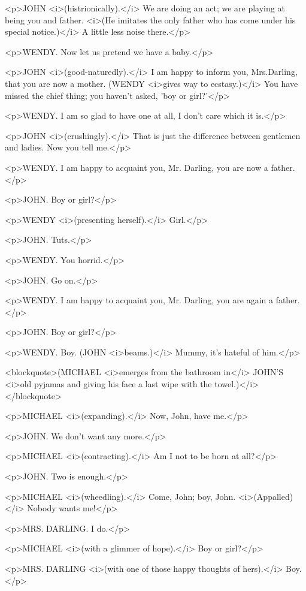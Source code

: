 <p>JOHN <i>(histrionically).</i> We are doing an act; we are playing at being you and father. <i>(He imitates the only father who has come under his special notice.)</i> A little less noise there.</p>

<p>WENDY. Now let us pretend we have a baby.</p>

<p>JOHN <i>(good-naturedly).</i> I am happy to inform you, Mrs.Darling, that you are now a mother. (WENDY <i>gives way to ecstasy.)</i> You have missed the chief thing; you haven't asked, 'boy or girl?'</p>

<p>WENDY. I am so glad to have one at all, I don't care which it is.</p>

<p>JOHN <i>(crushingly).</i> That is just the difference between gentlemen and ladies. Now you tell me.</p>

<p>WENDY. I am happy to acquaint you, Mr. Darling, you are now a father.</p>

<p>JOHN. Boy or girl?</p>

<p>WENDY <i>(presenting herself).</i> Girl.</p>

<p>JOHN. Tuts.</p>

<p>WENDY. You horrid.</p>

<p>JOHN. Go on.</p>

<p>WENDY. I am happy to acquaint you, Mr. Darling, you are again a father.</p>

<p>JOHN. Boy or girl?</p>

<p>WENDY. Boy. (JOHN <i>beams.)</i> Mummy, it's hateful of him.</p>

<blockquote>(MICHAEL <i>emerges from the bathroom in</i> JOHN'S <i>old pyjamas and giving his face a last wipe with the towel.)</i></blockquote>

<p>MICHAEL <i>(expanding).</i> Now, John, have me.</p>

<p>JOHN. We don't want any more.</p>

<p>MICHAEL <i>(contracting).</i> Am I not to be born at all?</p>

<p>JOHN. Two is enough.</p>

<p>MICHAEL <i>(wheedling).</i> Come, John; boy, John. <i>(Appalled)</i> Nobody wants me!</p>

<p>MRS. DARLING. I do.</p>

<p>MICHAEL <i>(with a glimmer of hope).</i> Boy or girl?</p>

<p>MRS. DARLING <i>(with one of those happy thoughts of hers).</i> Boy.</p>

